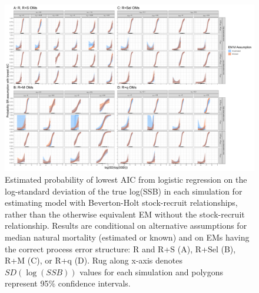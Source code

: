 \documentclass[
  12pt,
]{article}
\begin{document}
\begin{landscape}
\begin{figure}
\begin{center}
\includegraphics{sr_aic_plots}
\end{center}
\caption{Estimated probability of lowest AIC from logistic regression on the log-standard deviation of the true log(SSB) in each simulation for estimating model with Beverton-Holt stock-recruit relationships, rather than the otherwise equivalent EM without the stock-recruit relationship. Results are conditional on alternative assumptions for median natural mortality (estimated or known) and on EMs having the correct process error structure: R and R+S (A), R+Sel (B), R+M (C), or R+q (D). Rug along x-axis denotes $SD(\log(SSB))$ values for each simulation and polygons represent 95\% confidence intervals.}\label{sr_aic_supp}
\end{figure}
\end{landscape}

\clearpage
\end{document}
